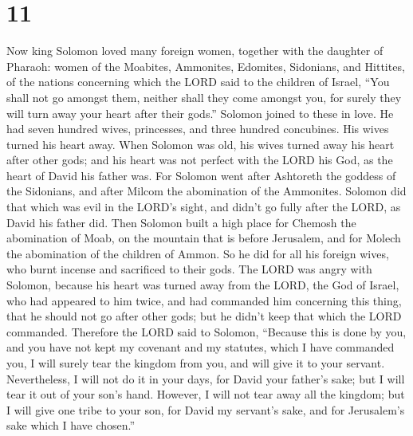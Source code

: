 \hypertarget{section-10}{%
\section{11}\label{section-10}}

 Now king Solomon loved many foreign women, together with
the daughter of Pharaoh: women of the Moabites, Ammonites, Edomites,
Sidonians, and Hittites,  of the nations concerning which
the LORD said to the children of Israel, ``You shall not go amongst
them, neither shall they come amongst you, for surely they will turn
away your heart after their gods.'' Solomon joined to these in love.
 He had seven hundred wives, princesses, and three hundred
concubines. His wives turned his heart away.  When Solomon
was old, his wives turned away his heart after other gods; and his heart
was not perfect with the LORD his God, as the heart of David his father
was.  For Solomon went after Ashtoreth the goddess of the
Sidonians, and after Milcom the abomination of the Ammonites.
 Solomon did that which was evil in the LORD's sight, and
didn't go fully after the LORD, as David his father did. 
Then Solomon built a high place for Chemosh the abomination of Moab, on
the mountain that is before Jerusalem, and for Molech the abomination of
the children of Ammon.  So he did for all his foreign wives,
who burnt incense and sacrificed to their gods.  The LORD
was angry with Solomon, because his heart was turned away from the LORD,
the God of Israel, who had appeared to him twice,  and had
commanded him concerning this thing, that he should not go after other
gods; but he didn't keep that which the LORD commanded. 
Therefore the LORD said to Solomon, ``Because this is done by you, and
you have not kept my covenant and my statutes, which I have commanded
you, I will surely tear the kingdom from you, and will give it to your
servant.  Nevertheless, I will not do it in your days, for
David your father's sake; but I will tear it out of your son's hand.
 However, I will not tear away all the kingdom; but I will
give one tribe to your son, for David my servant's sake, and for
Jerusalem's sake which I have chosen.''

